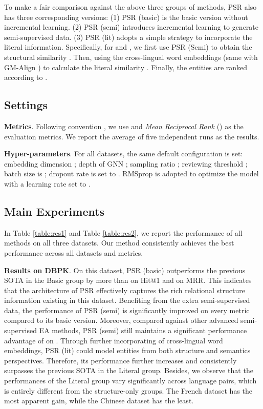 \documentclass[sigconf]{acmart}
\begin{document}
To make a fair comparison against the above three groups of methods, PSR also has three corresponding versions:
(1) PSR (basic) is the basic version without incremental learning.
(2) PSR (semi) introduces incremental learning to generate semi-supervised data.
(3) PSR (lit) adopts a simple strategy to incorporate the literal information.
Specifically, for  and , we first use PSR (Semi) to obtain the structural similarity .
Then, using the cross-lingual word embeddings (same with GM-Align \cite{DBLP:conf/iclr/LampleCRDJ18}) to calculate the literal similarity .
Finally, the entities are ranked according to .

\vspace{-1em}
\subsection{Settings}
\textbf{Metrics}.
Following convention \cite{DBLP:conf/ijcai/ChenTYZ17,DBLP:conf/emnlp/WangLLZ18,DBLP:conf/ijcai/SunHZQ18,DBLP:conf/acl/XuWYFSWY19}, we use  and \emph{Mean Reciprocal Rank} () as the evaluation metrics.
We report the average of five independent runs as the results.

\noindent
\textbf{Hyper-parameters}.
For all datasets, the same default configuration is set:
embedding dimension ;
depth of GNN ;
sampling ratio ;
reviewing threshold ;
batch size is ; dropout rate is set to .
RMSprop is adopted to optimize the model with a learning rate set to .

\vspace{-1em}
\subsection{Main Experiments}
In Table \ref{table:res1} and Table \ref{table:res2}, we report the performance of all methods on all three datasets.
Our method consistently achieves the best performance across all datasets and metrics.

\noindent
\textbf{Results on DBPK}.
On this dataset, PSR (basic) outperforms the previous SOTA in the Basic group by more than  on Hit@1 and  on MRR.
This indicates that the architecture of PSR effectively captures the rich relational structure information existing in this dataset.
Benefiting from the extra semi-supervised data, the performance of PSR (semi) is significantly improved on every metric compared to its basic version. 
Moreover, compared against other advanced semi-supervised EA methods, PSR (semi) still maintains a significant performance advantage of  on .
Through further incorporating of cross-lingual word embeddings, PSR (lit) could model entities from both structure and semantics perspectives.
Therefore, its performance further increases and consistently surpasses the previous SOTA in the Literal group.
Besides, we observe that the performances of the Literal group vary significantly across language pairs, which is entirely different from the structure-only groups.
The French dataset has the most apparent gain, while the Chinese dataset has the least.
\end{document}
